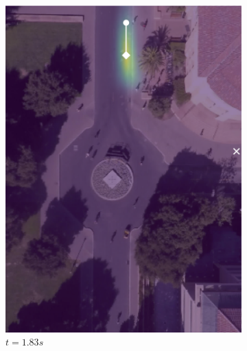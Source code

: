 \documentclass[conference]{IEEEtran}
\begin{document}
\begin{figure}
	\centering
	\begin{subfigure}[b]{.45\linewidth}
		\includegraphics[width=\linewidth]{./figures/FirstPage/gates_1_2_t=55.png}
		\caption{$t=1.83s$}
	\end{subfigure}
		\begin{subfigure}[b]{.45\linewidth}

\end{subfigure}
\end{figure}
\end{document}
